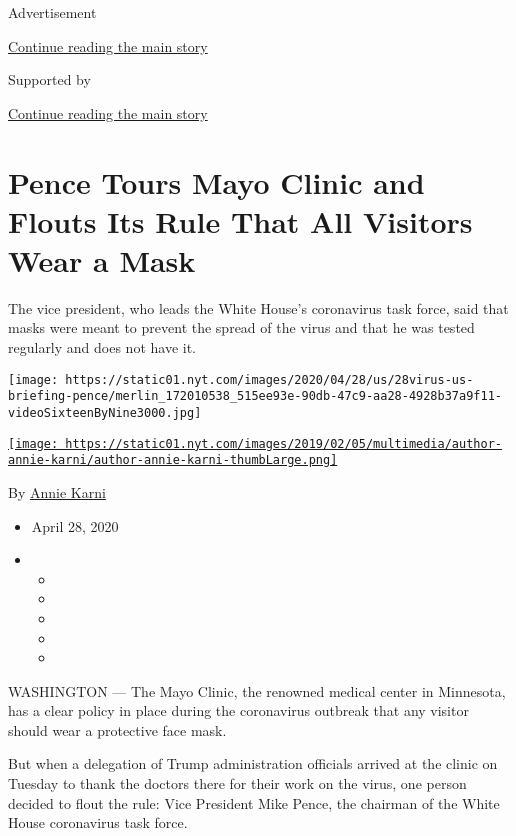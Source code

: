 Advertisement

\protect\hyperlink{after-top}{Continue reading the main story}

Supported by

\protect\hyperlink{after-sponsor}{Continue reading the main story}

\hypertarget{pence-tours-mayo-clinic-and-flouts-its-rule-that-all-visitors-wear-a-mask}{%
\section{Pence Tours Mayo Clinic and Flouts Its Rule That All Visitors
Wear a
Mask}\label{pence-tours-mayo-clinic-and-flouts-its-rule-that-all-visitors-wear-a-mask}}

The vice president, who leads the White House's coronavirus task force,
said that masks were meant to prevent the spread of the virus and that
he was tested regularly and does not have it.

\texttt{[image: https://static01.nyt.com/images/2020/04/28/us/28virus-us-briefing-pence/merlin\_172010538\_515ee93e-90db-47c9-aa28-4928b37a9f11-videoSixteenByNine3000.jpg]}

\href{https://www.nytimes.com/by/annie-karni}{\texttt{[image: https://static01.nyt.com/images/2019/02/05/multimedia/author-annie-karni/author-annie-karni-thumbLarge.png]}}

By \href{https://www.nytimes.com/by/annie-karni}{Annie Karni}

\begin{itemize}
\item
  April 28, 2020
\item
  \begin{itemize}
  \item
  \item
  \item
  \item
  \item
  \end{itemize}
\end{itemize}

WASHINGTON --- The Mayo Clinic, the renowned medical center in
Minnesota, has a clear policy in place during the coronavirus outbreak
that any visitor should wear a protective face mask.

But when a delegation of Trump administration officials arrived at the
clinic on Tuesday to thank the doctors there for their work on the
virus, one person decided to flout the rule: Vice President Mike Pence,
the chairman of the White House coronavirus task force.

